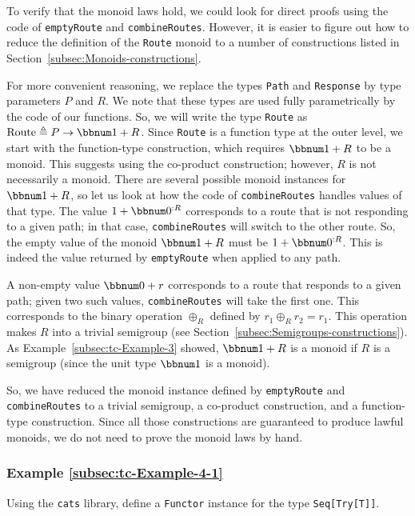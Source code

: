 To verify that the monoid laws hold, we could look for direct proofs
using the code of \lstinline!emptyRoute! and \lstinline!combineRoutes!.
However, it is easier to figure out how to reduce the definition of
the \lstinline!Route! monoid to a number of constructions listed
in Section~\ref{subsec:Monoids-constructions}. 

For more convenient reasoning, we replace the types \lstinline!Path!
and \lstinline!Response! by type parameters $P$ and $R$. We note
that these types are used fully parametrically by the code of our
functions. So, we will write the type \lstinline!Route! as $\text{Route}\triangleq P\rightarrow\bbnum 1+R$.
Since \lstinline!Route! is a function type at the outer level, we
start with the function-type construction, which requires $\bbnum 1+R$
to be a monoid. This suggests using the co-product construction; however,
$R$ is not necessarily a monoid. There are several possible monoid
instances for $\bbnum 1+R$, so let us look at how the code of \lstinline!combineRoutes!
handles values of that type. The value $1+\bbnum 0^{:R}$ corresponds
to a route that is not responding to a given path; in that case, \lstinline!combineRoutes!
will switch to the other route. So, the empty value of the monoid
$\bbnum 1+R$ must be $1+\bbnum 0^{:R}$. This is indeed the value
returned by \lstinline!emptyRoute! when applied to any path.

A non-empty value $\bbnum 0+r$ corresponds to a route that responds
to a given path; given two such values, \lstinline!combineRoutes!
will take the first one. This corresponds to the binary operation
$\oplus_{R}$ defined by $r_{1}\oplus_{R}r_{2}=r_{1}$. This operation
makes $R$ into a trivial semigroup (see Section~\ref{subsec:Semigroups-constructions}).
As Example~\ref{subsec:tc-Example-3} showed, $\bbnum 1+R$ is a
monoid if $R$ is a semigroup (since the unit type $\bbnum 1$ is
a monoid).

So, we have reduced the monoid instance defined by \lstinline!emptyRoute!
and \lstinline!combineRoutes! to a trivial semigroup, a co-product
construction, and a function-type construction. Since all those constructions
are guaranteed to produce lawful monoids, we do not need to prove
the monoid laws by hand.

\subsubsection{Example \label{subsec:tc-Example-4-1}\ref{subsec:tc-Example-4-1}}

Using the \texttt{cats} library, define a \lstinline!Functor! instance
for the type \lstinline!Seq[Try[T]]!.

